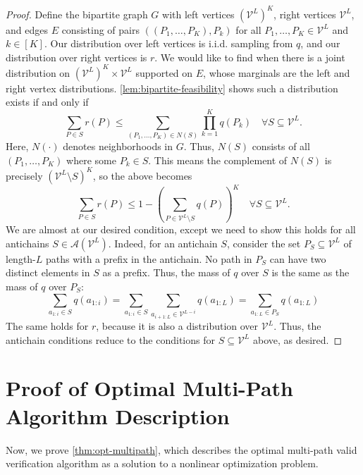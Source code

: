 \documentclass{article}
\theoremstyle{plain}
\theoremstyle{definition}
\theoremstyle{remark}
\newcommand{\V}{\mathcal{V}}
\begin{document}
\begin{proof}
    Define the bipartite graph $G$ with left vertices $(\V^L)^K$, right vertices $\V^L$, and edges $E$ consisting of pairs $((P_1,\ldots,P_K),P_k)$ for all $P_1,\ldots,P_K \in \V^L$ and $k \in [K]$. Our distribution over left vertices is i.i.d. sampling from $q$, and our distribution over right vertices is $r$. We would like to find when there is a joint distribution on $(\V^L)^K \times \V^L$ supported on $E$, whose marginals are the left and right vertex distributions. \cref{lem:bipartite-feasibility} shows such a distribution exists if and only if
    \begin{equation}
        \sum_{P \in S} r(P) \leq \sum_{(P_1,\ldots,P_K) \in N(S)} \prod_{k=1}^K q(P_k) \quad \forall S \subseteq \V^L. 
    \end{equation}
    Here, $N(\cdot)$ denotes neighborhoods in $G$. Thus, $N(S)$ consists of all $(P_1,\ldots,P_K)$ where some $P_k \in S$. This means the complement of $N(S)$ is precisely $(\V^L \setminus S)^K$, so the above becomes
    \begin{equation}
        \sum_{P \in S} r(P) \leq 1 - \left(\sum_{P \in \V^L \setminus S} q(P)\right)^K \quad \forall S \subseteq \V^L. 
    \end{equation}
    We are almost at our desired condition, except we need to show this holds for all antichains $S \in \mathcal{A}(\V^L)$. Indeed, for an antichain $S$, consider the set $P_S \subseteq \V^L$ of length-$L$ paths with a prefix in the antichain. No path in $P_S$ can have two distinct elements in $S$ as a prefix. Thus, the mass of $q$ over $S$ is the same as the mass of $q$ over $P_S$:
    \begin{equation}
        \sum_{a_{1:i} \in S} q(a_{1:i}) = \sum_{a_{1:i} \in S} \sum_{a_{i+1:L} \in \V^{L-i}} q(a_{1:L}) = \sum_{a_{1:L} \in P_S} q(a_{1:L})
    \end{equation}
    The same holds for $r$, because it is also a distribution over $\V^L$. Thus, the antichain conditions reduce to the conditions for $S \subseteq \V^L$ above, as desired.
\end{proof}

\section{Proof of Optimal Multi-Path Algorithm Description}
\label{appendix:optimal-mp}

Now, we prove \cref{thm:opt-multipath}, which describes the optimal multi-path valid verification algorithm as a solution to a nonlinear optimization problem.
\end{document}
